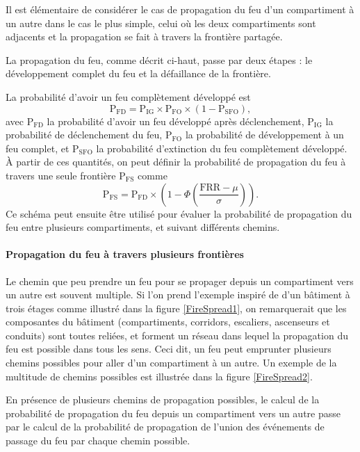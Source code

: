\documentclass[11pt]{article}
\begin{document}
Il est élémentaire de considérer le cas de propagation du feu d'un compartiment à un autre dans le cas le plus simple, celui où les deux compartiments sont adjacents et la propagation se fait à travers la frontière partagée.

La propagation du feu, comme décrit ci-haut, passe par deux étapes : le développement complet du feu et la défaillance de la frontière.

La probabilité d'avoir un feu complètement développé est 
\begin{equation}
\text{P}_{\text{FD}} = \text{P}_{\text{IG}} \times \text{P}_{\text{FO}} \times (1-\text{P}_{\text{SFO}}),
\end{equation}
avec $\text{P}_{\text{FD}}$ la probabilité d'avoir un feu développé après déclenchement, $\text{P}_{\text{IG}}$ la probabilité de déclenchement du feu, $\text{P}_{\text{FO}}$ la probabilité de développement à un feu complet, et $\text{P}_{\text{SFO}}$ la probabilité d'extinction du feu complètement développé. À partir de ces quantités, on peut définir la probabilité de propagation du feu à travers une seule frontière $\text{P}_{\text{FS}}$ comme
\begin{equation}
\text{P}_{\text{FS}} = \text{P}_{\text{FD}} \times\left(1 - \Phi\left(\frac{\text{FRR} - \mu}{\sigma} \right)\right).
\end{equation}
Ce schéma peut ensuite être utilisé pour évaluer la probabilité de propagation du feu entre plusieurs compartiments, et suivant différents chemins.

\paragraph{Propagation du feu à travers plusieurs frontières}

Le chemin que peu prendre un feu pour se propager depuis un compartiment vers un autre est souvent multiple. Si l'on prend l'exemple inspiré de \cite{benichou2001model} d'un bâtiment à trois étages comme illustré dans la figure \ref{FireSpread1}, on remarquerait que les composantes du bâtiment (compartiments, corridors, escaliers, ascenseurs et conduits) sont toutes reliées, et forment un réseau dans lequel la propagation du feu est possible dans tous les sens. Ceci dit, un feu peut emprunter plusieurs chemins possibles pour aller d'un compartiment à un autre. Un exemple de la multitude de chemins possibles est illustrée dans la figure \ref{FireSpread2}.

En présence de plusieurs chemins de propagation possibles, le calcul de la probabilité de propagation du feu depuis un compartiment vers un autre passe par le calcul de la probabilité de propagation de l'union des événements de passage du feu par chaque chemin possible.
\end{document}
